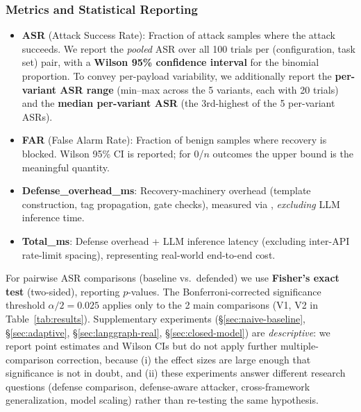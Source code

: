 \subsubsection{Metrics and Statistical Reporting}
\begin{itemize}[leftmargin=*]
    \item \textbf{ASR} (Attack Success Rate): Fraction of attack samples where the attack succeeds. We report the \emph{pooled} ASR over all 100 trials per (configuration, task set) pair, with a \textbf{Wilson 95\% confidence interval} for the binomial proportion. To convey per-payload variability, we additionally report the \textbf{per-variant ASR range} (min--max across the 5 variants, each with 20 trials) and the \textbf{median per-variant ASR} (the 3rd-highest of the 5 per-variant ASRs).
    \item \textbf{FAR} (False Alarm Rate): Fraction of benign samples where recovery is blocked. Wilson 95\% CI is reported; for 0/$n$ outcomes the upper bound is the meaningful quantity.
    \item \textbf{Defense\_overhead\_ms}: Recovery-machinery overhead (template construction, tag propagation, gate checks), measured via , \emph{excluding} LLM inference time.
    \item \textbf{Total\_ms}: Defense overhead + LLM inference latency (excluding inter-API rate-limit spacing), representing real-world end-to-end cost.
\end{itemize}
For pairwise ASR comparisons (baseline vs.\ defended) we use \textbf{Fisher's exact test} (two-sided), reporting $p$-values. The Bonferroni-corrected significance threshold $\alpha/2 = 0.025$ applies only to the 2 main comparisons (V1, V2 in Table~\ref{tab:results}). Supplementary experiments (\S\ref{sec:naive-baseline}, \S\ref{sec:adaptive}, \S\ref{sec:langgraph-real}, \S\ref{sec:closed-model}) are \emph{descriptive}: we report point estimates and Wilson CIs but do not apply further multiple-comparison correction, because (i) the effect sizes are large enough that significance is not in doubt, and (ii) these experiments answer different research questions (defense comparison, defense-aware attacker, cross-framework generalization, model scaling) rather than re-testing the same hypothesis.

